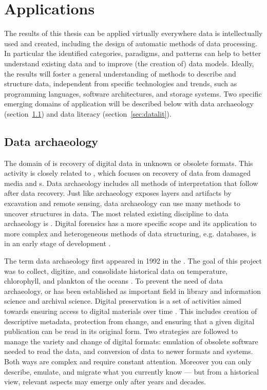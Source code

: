 \section{Applications}
\label{sec:applications}

The results of this thesis can be applied virtually everywhere data is
intellectually used and created, including the design of automatic methods of
data processing. In particular the identified categories, paradigms, and
patterns can help to better understand existing data and to improve (the
creation of) data models. Ideally, the results will foster a general
understanding of methods to describe and structure data, independent from
specific technologies and trends, such as programming languages, software
architectures, and storage systems.  Two specific emerging domains of
application will be described below with data archaeology
(section~\ref{sec:dataarchaeology}) and data literacy
(section~\ref{sec:datalit}).

\subsection{Data archaeology}
\label{sec:dataarchaeology}

The domain of  is recovery of digital data in unknown or
obsolete formats. This activity is closely related to ,
which focuses on recovery of data from damaged media and s.
Data archaeology includes all methods of interpretation that follow after data
recovery.  Just like archaeology exposes layers and artifacts by excavation and
remote sensing, data archaeology can use many methods to uncover structures in
data. The most related existing discipline to data archaeology is .  Digital forensics has a more specific scope and its application to
more complex and heterogeneous methods of data structuring, e.g.  databases, is
in an early stage of development \cite{Olivier2009}.

The term data archaeology first appeared in 1992 in the . The goal of this project
was to collect, digitize, and consolidate historical data on temperature,
chlorophyll, and plankton of the oceans \cite{GODAR2007}.  To prevent the need
of data archaeology,  or  has been established as important field in library and
information science and archival science. Digital preservation is a set of
activities aimed towards ensuring access to digital materials over time
\cite{Caplan2008}. This includes creation of descriptive metadata, protection
from change, and ensuring that a given digital publication can be read in its
original form. Two strategies are followed to manage the variety and change of
digital formats: emulation of obsolete software needed to read the data, and
conversion of data to newer formats and systems. Both ways are complex and
require constant attention.  Moreover you can only describe, emulate, and
migrate what you currently know --- but from a historical view, relevant
aspects may emerge only after years and decades.

